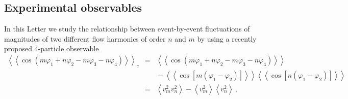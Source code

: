 \subsection{Experimental observables}
\label{sec:method}
In this Letter we study the relationship between event-by-event fluctuations of magnitudes of two different flow harmonics of order $n$ and $m$ by using a recently proposed 4-particle observable~\cite{Bilandzic:2013kga}
%
\begin{eqnarray}
\left<\left<\cos(m\varphi_1\!+\!n\varphi_2\!-\!m\varphi_3-\!n\varphi_4)\right>\right>_c &=& \left<\left<\cos(m\varphi_1\!+\!n\varphi_2\!-\!m\varphi_3-\!n\varphi_4)\right>\right>\nonumber\\
&&{}-\left<\left<\cos[m(\varphi_1\!-\!\varphi_2)]\right>\right>\left<\left<\cos[n(\varphi_1\!-\!\varphi_2)]\right>\right>\nonumber\\
&=&\left<v_{m}^2v_{n}^2\right>-\left<v_{m}^2\right>\left<v_{n}^2\right>\,,%
\label{eq:4p_cumulant}
\end{eqnarray}
%

